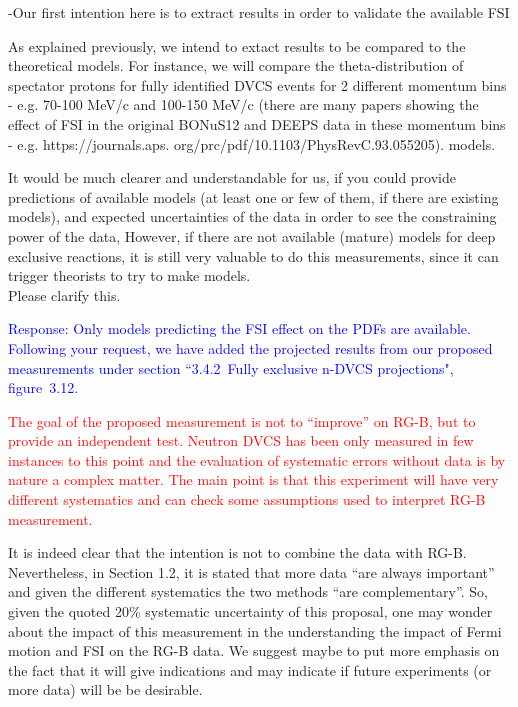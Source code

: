   
 \begin{itemize}
  {\color{red} \item  -Our first intention here is to extract results in order 
     to validate the available FSI
  \item  As explained previously, we intend to extact results to be compared to 
     the theoretical models. For instance, we will compare the 
       theta-distribution of spectator protons for fully identified DVCS events 
       for 2 different momentum bins - e.g. 70-100 MeV/c and 100-150 MeV/c 
       (there are many papers showing the effect of FSI in the original
 BONuS12 and DEEPS data in these momentum bins - e.g. https://journals.aps.
 org/prc/pdf/10.1103/PhysRevC.93.055205).
 models.} \newline
 
 It would be much clearer and understandable for us, if you could provide 
       predictions of available models (at least one or few of them, if there 
       are existing models), and expected uncertainties of the data in order to 
       see the constraining power of the data, However, if there are not 
       available (mature) models for deep exclusive reactions, it is still very 
       valuable to do this measurements, since it can trigger theorists to try 
       to make models. \\
  Please clarify this.

  
  \textcolor{blue}{Response: Only models predicting the FSI effect on the PDFs 
       are available. Following your request, we have added the projected 
       results from our proposed measurements under section ``3.4.2~Fully 
       exclusive n-DVCS projections", figure~3.12. }
  
  \textcolor{red}{
  \item   The goal of the proposed measurement is not to ``improve'' on RG-B, 
     but to provide an independent test. Neutron DVCS has been only measured in 
       few instances to this point and the evaluation of systematic errors 
       without data is by nature a complex matter. The main point is that this 
       experiment will have very different systematics and can check some 
       assumptions used to interpret RG-B measurement.
  }
  \newline
  
  It is indeed clear that the intention is not to combine the data with RG-B.  
       Nevertheless, in Section 1.2, it is stated that more data ``are always 
       important'' and given the different systematics the two methods ``are 
       complementary''. So, given the quoted 20\% systematic uncertainty of 
       this proposal, one may wonder about the impact of this measurement in 
       the understanding the impact of Fermi motion and FSI on the RG-B data.
  We suggest maybe to put more emphasis on the fact that it will give 
       indications and may indicate if future experiments (or more data) will 
       be be desirable.
  

\end{itemize}
